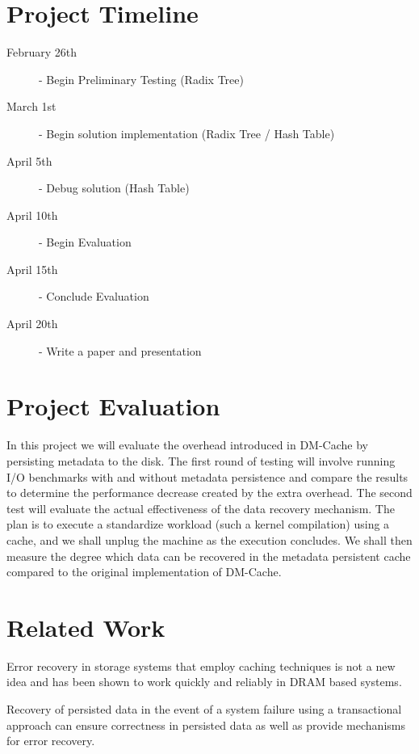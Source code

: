\documentclass[letterpaper,12pt]{article}
\begin{document}

\section*{Project Timeline}

\begin{description}
  \item[February 26th] - Begin Preliminary Testing (Radix Tree)
  \item[March 1st] - Begin solution implementation (Radix Tree / Hash
  Table)
  \item[April 5th] - Debug solution (Hash Table)
  \item[April 10th] - Begin Evaluation
  \item[April 15th] - Conclude Evaluation
  \item[April 20th] - Write a paper and presentation
\end{description}


\section*{Project Evaluation}

In this project we will evaluate the overhead introduced in DM-Cache
by persisting metadata to the disk. The first round of testing will
involve running I/O benchmarks with and without metadata persistence
and compare the results to determine the performance decrease created
by the extra overhead. The second test will evaluate the actual
effectiveness of the data recovery mechanism. The plan is to execute a
standardize workload (such a kernel compilation) using a cache, and we
shall unplug the machine as the execution concludes. We shall then
measure the degree which data can be recovered in the metadata
persistent cache compared to the original implementation of DM-Cache.


\section*{Related Work}

Error recovery in storage systems that employ caching techniques is
not a new idea and has been shown to work quickly and reliably in DRAM
based systems\cite{RAMCloud}.

Recovery of persisted data in the event of a system failure using a
transactional approach can ensure correctness in persisted data as
well as provide mechanisms for error recovery\cite{NVHeaps}.
\end{document}
